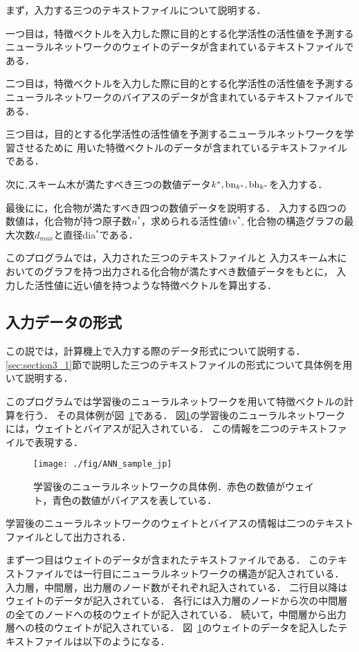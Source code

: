 \documentclass[11pt,titlepage,dvipdfmx,twoside]{jarticle}
\begin{document}
まず，入力する三つのテキストファイルについて説明する．

一つ目は，特徴ベクトルを入力した際に目的とする化学活性の活性値を予測する
ニューラルネットワークのウェイトのデータが含まれているテキストファイルである．

二つ目は，特徴ベクトルを入力した際に目的とする化学活性の活性値を予測する
ニューラルネットワークのバイアスのデータが含まれているテキストファイルである．

三つ目は，目的とする化学活性の活性値を予測するニューラルネットワークを学習させるために
用いた特徴ベクトルのデータが含まれているテキストファイルである．

次に,スキーム木が満たすべき三つの数値データ$k^\ast, {\rm bn}_{k^\ast}, {\rm bh}_{k^\ast}$を入力する．

最後にに，化合物が満たすべき四つの数値データを説明する．
入力する四つの数値は，化合物が持つ原子数$n^{\ast}$，求められる活性値tv$^\ast$, 化合物の構造グラフの最大次数$d_{max}$と直径dia$^\ast$である．

このプログラムでは，入力された三つのテキストファイルと
入力スキーム木においてのグラフを持つ出力される化合物が満たすべき数値データをもとに，
入力した活性値に近い値を持つような特徴ベクトルを算出する．

\bigskip

\subsection{入力データの形式}
\label{sec:section3_2}

この説では，計算機上で入力する際のデータ形式について説明する．
\ref{sec:section3_1}節で説明した三つのテキストファイルの形式について具体例を用いて説明する．

このプログラムでは学習後のニューラルネットワークを用いて特徴ベクトルの計算を行う．
その具体例が図~\ref{fig:sample}である．
図\ref{fig:sample}の学習後のニューラルネットワークには，ウェイトとバイアスが記入されている．
この情報を二つのテキストファイルで表現する．

\begin{figure}[H]
  \centering
  \texttt{[image: ./fig/ANN\_sample\_jp]}
  \caption{学習後のニューラルネットワークの具体例．赤色の数値がウェイト，青色の数値がバイアスを表している．}
  \label{fig:sample}
\end{figure}

学習後のニューラルネットワークのウェイトとバイアスの情報は二つのテキストファイルとして出力される．

まず一つ目はウェイトのデータが含まれたテキストファイルである．
このテキストファイルでは一行目にニューラルネットワークの構造が記入されている．
入力層，中間層，出力層のノード数がそれぞれ記入されている．
二行目以降はウェイトのデータが記入されている．
各行には入力層のノードから次の中間層の全てのノードへの枝のウェイトが記入されている．
続いて，中間層から出力層への枝のウェイトが記入されている．
図~\ref{fig:sample}のウェイトのデータを記入したテキストファイルは以下のようになる．
\end{document}
